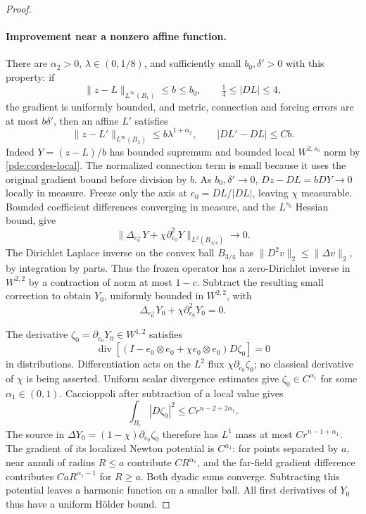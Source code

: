 \begin{proof}
\paragraph{Improvement near a nonzero affine function.}
There are \(\alpha_2>0\), \(\lambda\in(0,1/8)\), and sufficiently
small \(b_0,\delta'>0\) with this property: if
\[
 \|z-L\|_{L^\infty(B_1)}\le b\le b_0,\qquad
 \tfrac14\le|DL|\le4,
\]
the gradient is uniformly bounded, and metric, connection and forcing
errors are at most \(b\delta'\), then an affine \(L'\) satisfies
\begin{equation}
 \|z-L'\|_{L^\infty(B_\lambda)}
 \le b\lambda^{1+\alpha_2},\qquad |DL'-DL|\le Cb.
 \label{pde:affine-improvement}
\end{equation}
Indeed \(Y=(z-L)/b\) has bounded supremum and bounded local
\(W^{2,s_0}\) norm by \eqref{pde:cordes-local}.  The normalized
connection term is small because it uses the original gradient bound
before division by \(b\).  As \(b_0,\delta'\to0\),
\(Dz-DL=bDY\to0\) locally in measure.  Freeze only the axis at
\(e_0=DL/|DL|\), leaving \(\chi\) measurable.  Bounded coefficient
differences converging in measure, and the \(L^{s_0}\) Hessian bound,
give
\begin{equation}
 \|\Delta_{e_0^\perp}Y+\chi\partial_{e_0}^2Y\|_{L^2(B_{3/4})}
 \longrightarrow0.
 \label{pde:axis-residual}
\end{equation}
The Dirichlet Laplace inverse on the convex ball \(B_{3/4}\) has
\(\|D^2v\|_2\le\|\Delta v\|_2\), by integration by parts.
Thus the frozen operator has a zero-Dirichlet inverse in \(W^{2,2}\)
by a contraction of norm at most \(1-c\).
Subtract the resulting small correction to obtain \(Y_0\), uniformly
bounded in \(W^{2,2}\), with
\[
 \Delta_{e_0^\perp}Y_0+\chi\partial_{e_0}^2Y_0=0.
\]

The derivative \(\zeta_0=\partial_{e_0}Y_0\in W^{1,2}\) satisfies
\begin{equation}
 \operatorname{div}\left[
 (I-e_0\otimes e_0+\chi e_0\otimes e_0)D\zeta_0\right]=0
 \label{pde:frozen-derivative}
\end{equation}
in distributions.  Differentiation acts on the \(L^2\) flux
\(\chi\partial_{e_0}\zeta_0\); no classical derivative of \(\chi\)
is being asserted.  Uniform scalar divergence estimates give
\(\zeta_0\in C^{\alpha_1}\) for some \(\alpha_1\in(0,1)\).
Caccioppoli after subtraction of a local value gives
\[
 \int_{B_r}|D\zeta_0|^2\le Cr^{n-2+2\alpha_1}.
\]
The source in
\(\Delta Y_0=(1-\chi)\partial_{e_0}\zeta_0\)
therefore has \(L^1\) mass at most \(Cr^{n-1+\alpha_1}\).
The gradient of its localized Newton potential is \(C^{\alpha_1}\):
for points separated by \(a\), near annuli of radius \(R\le a\)
contribute \(CR^{\alpha_1}\), and the far-field gradient difference
contributes \(CaR^{\alpha_1-1}\) for \(R\ge a\).
Both dyadic sums converge.  Subtracting this potential leaves a harmonic
function on a smaller ball.  All first derivatives of \(Y_0\) thus
have a uniform H\"older bound.


\end{proof}

